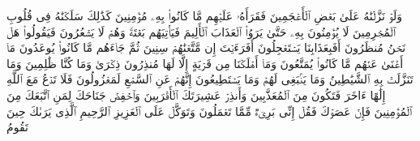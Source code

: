 وَلَوۡ نَزَّلۡنَٰهُ عَلَىٰ بَعۡضِ ٱلۡأَعۡجَمِینَ%
\stopbuffer
\startbuffer[\q:26:199]
فَقَرَأَهُۥ عَلَیۡهِم مَّا كَانُوا۟ بِهِۦ مُؤۡمِنِینَ%
\stopbuffer
\startbuffer[\q:26:200]
كَذَٰلِكَ سَلَكۡنَٰهُ فِی قُلُوبِ ٱلۡمُجۡرِمِینَ%
\stopbuffer
\startbuffer[\q:26:201]
لَا یُؤۡمِنُونَ بِهِۦ حَتَّىٰ یَرَوُا۟ ٱلۡعَذَابَ ٱلۡأَلِیمَ%
\stopbuffer
\startbuffer[\q:26:202]
فَیَأۡتِیَهُم بَغۡتَةࣰ وَهُمۡ لَا یَشۡعُرُونَ%
\stopbuffer
\startbuffer[\q:26:203]
فَیَقُولُوا۟ هَلۡ نَحۡنُ مُنظَرُونَ%
\stopbuffer
\startbuffer[\q:26:204]
أَفَبِعَذَابِنَا یَسۡتَعۡجِلُونَ%
\stopbuffer
\startbuffer[\q:26:205]
أَفَرَءَیۡتَ إِن مَّتَّعۡنَٰهُمۡ سِنِینَ%
\stopbuffer
\startbuffer[\q:26:206]
ثُمَّ جَاۤءَهُم مَّا كَانُوا۟ یُوعَدُونَ%
\stopbuffer
\startbuffer[\q:26:207]
مَاۤ أَغۡنَىٰ عَنۡهُم مَّا كَانُوا۟ یُمَتَّعُونَ%
\stopbuffer
\startbuffer[\q:26:208]
وَمَاۤ أَهۡلَكۡنَا مِن قَرۡیَةٍ إِلَّا لَهَا مُنذِرُونَ%
\stopbuffer
\startbuffer[\q:26:209]
ذِكۡرَىٰ وَمَا كُنَّا ظَٰلِمِینَ%
\stopbuffer
\startbuffer[\q:26:210]
وَمَا تَنَزَّلَتۡ بِهِ ٱلشَّیَٰطِینُ%
\stopbuffer
\startbuffer[\q:26:211]
وَمَا یَنۢبَغِی لَهُمۡ وَمَا یَسۡتَطِیعُونَ%
\stopbuffer
\startbuffer[\q:26:212]
إِنَّهُمۡ عَنِ ٱلسَّمۡعِ لَمَعۡزُولُونَ%
\stopbuffer
\startbuffer[\q:26:213]
فَلَا تَدۡعُ مَعَ ٱللَّهِ إِلَٰهًا ءَاخَرَ فَتَكُونَ مِنَ ٱلۡمُعَذَّبِینَ%
\stopbuffer
\startbuffer[\q:26:214]
وَأَنذِرۡ عَشِیرَتَكَ ٱلۡأَقۡرَبِینَ%
\stopbuffer
\startbuffer[\q:26:215]
وَٱخۡفِضۡ جَنَاحَكَ لِمَنِ ٱتَّبَعَكَ مِنَ ٱلۡمُؤۡمِنِینَ%
\stopbuffer
\startbuffer[\q:26:216]
فَإِنۡ عَصَوۡكَ فَقُلۡ إِنِّی بَرِیۤءࣱ مِّمَّا تَعۡمَلُونَ%
\stopbuffer
\startbuffer[\q:26:217]
وَتَوَكَّلۡ عَلَى ٱلۡعَزِیزِ ٱلرَّحِیمِ%
\stopbuffer
\startbuffer[\q:26:218]
ٱلَّذِی یَرَىٰكَ حِینَ تَقُومُ%
\stopbuffer
